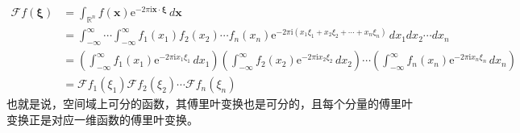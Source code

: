 {\color{blue}
\begin{align*}
\mathcal{F} f(\boldsymbol{\xi})&=\int_{\mathbb{R}^n}f(\mathbf{x})\mathrm{e}^{-2\pi \mathrm{i} \mathbf{x}\cdot\boldsymbol{\xi}}\,d\mathbf{x}\\
&=\int_{-\infty}^{\infty}\cdots \int_{-\infty}^{\infty}f_1(x_1)f_2(x_2)\cdots f_n(x_n)\mathrm{e}^{-2\pi \mathrm{i} (x_1\xi_1+x_2\xi_2+\cdots +x_n\xi_n)}\,dx_1 dx_2\cdots dx_n\\
&=\left(\int_{-\infty}^{\infty}f_1(x_1)\mathrm{e}^{-2\pi \mathrm{i} x_1\xi_1}\,dx_1\right)\left(\int_{-\infty}^{\infty}f_2(x_2)\mathrm{e}^{-2\pi \mathrm{i} x_2\xi_2}\,dx_2\right)\cdots \left(\int_{-\infty}^{\infty}f_n(x_n)\mathrm{e}^{-2\pi \mathrm{i} x_n\xi_n}\,dx_n\right)\\
&=\mathcal{F} f_1(\xi_1)\mathcal{F} f_2(\xi_2)\cdots \mathcal{F} f_n(\xi_n)
\end{align*}}
也就是说，空间域上可分的函数，其傅里叶变换也是可分的，且每个分量的傅里叶变换正是对应一维函数的傅里叶变换。


